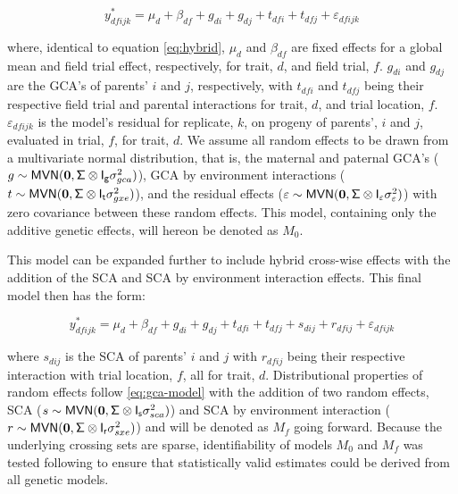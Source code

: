 \begin{equation}
  y_{dfijk}^* = \mu_d + \beta_{df} + g_{di} + g_{dj} + t_{dfi} + t_{dfj} + \varepsilon_{dfijk}
  \label{eq:gca-model}
\end{equation}

where, identical to equation \eqref{eq:hybrid}, \(\mu_d\) and \(\beta_{df}\) are fixed effects for a global mean and field trial effect, respectively, for trait, \(d\), and field trial, \(f\). \(g_{di}\) and \(g_{dj}\) are the GCA's of parents' \(i\) and \(j\), respectively, with \(t_{dfi}\) and \(t_{dfj}\) being their respective field trial and parental interactions for trait, \(d\), and trial location, \(f\). \(\varepsilon_{dfijk}\) is the model's residual for replicate, \(k\), on progeny of parents', \(i\) and \(j\), evaluated in trial, \(f\), for trait, \(d\). We assume all random effects to be drawn from a multivariate normal distribution, that is, the maternal and paternal GCA's (\(g\sim \mathsf{MVN}({\bf 0},\mathsf{\Sigma\otimes I_g}\sigma_{gca}^2)\)), GCA by environment interactions (\(t\sim \mathsf{MVN}({\bf 0},\mathsf{\Sigma\otimes I_t}\sigma_{gxe}^2)\)), and the residual effects (\(\varepsilon\sim \mathsf{MVN}({\bf 0},\mathsf{\Sigma\otimes I}_\varepsilon \sigma_\varepsilon^2)\)) with zero covariance between these random effects. This model, containing only the additive genetic effects, will hereon be denoted as \(M_0\).

This model can be expanded further to include hybrid cross-wise effects with the addition of the SCA and SCA by environment interaction effects. This final model then has the form:

\begin{equation}
  y_{dfijk}^* = \mu_d + \beta_{df} + g_{di} + g_{dj} + t_{dfi} + t_{dfj} + s_{dij} + r_{dfij} + \varepsilon_{dfijk}
  \label{eq:sca-model}
\end{equation}

where \(s_{dij}\) is the SCA of parents' \(i\) and \(j\) with \(r_{dfij}\) being their respective interaction with trial location, \(f\), all for trait, \(d\). Distributional properties of random effects follow \eqref{eq:gca-model} with the addition of two random effects, SCA (\(s\sim \mathsf{MVN}({\bf 0},\mathsf{\Sigma\otimes I_{s}}\sigma^2_{sca})\)) and SCA by environment interaction (\(r\sim \mathsf{MVN}({\bf 0},\mathsf{\Sigma\otimes I_{r}}\sigma^2_{sxe})\)) and will be denoted as \(M_f\) going forward. Because the underlying crossing sets are sparse, identifiability of models \(M_0\) and \(M_f\) was tested following \citep{Xenakis2019} to ensure that statistically valid estimates could be derived from all genetic models.

